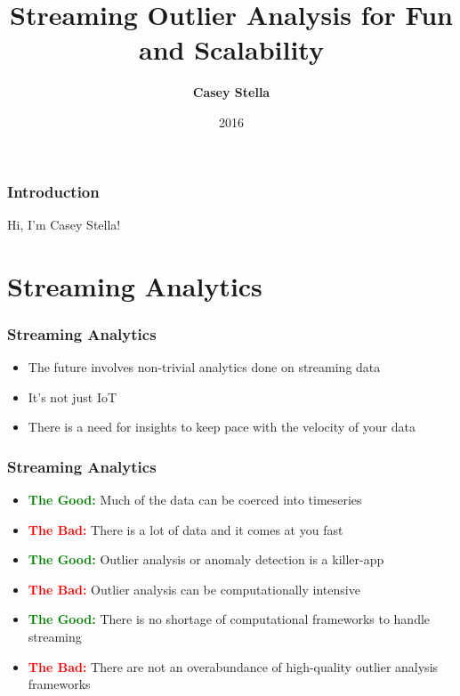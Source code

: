 \documentclass[aspectratio=169]{beamer}
\begin{document}
\author{{\bf Casey Stella}}
\title{{\bf Streaming Outlier Analysis for Fun and Scalability}}
\date{2016} 

\frame{\titlepage} 

\begingroup
\Huge
\begin{frame}
\frametitle{Introduction}
\begin{center}
Hi, I'm Casey Stella!
\end{center}
\end{frame}
\endgroup

\section{Streaming Analytics}
\begin{frame}
\frametitle{Streaming Analytics}
\begin{itemize}
\item The future involves non-trivial analytics done on streaming data
\item It's not just IoT
\item There is a need for insights to keep pace with the velocity of your data
\end{itemize}
\end{frame}

\begin{frame}
\frametitle{Streaming Analytics}
\begin{itemize}
\item {\textcolor{green}{\bf The Good:}} Much of the data can be coerced into timeseries\pause
\item {\textcolor{red}{\bf The Bad:}} There is a lot of data and it comes at you fast\pause
\item {\textcolor{green}{\bf The Good:}} Outlier analysis or anomaly detection is a killer-app\pause
\item {\textcolor{red}{\bf The Bad:}} Outlier analysis can be computationally intensive\pause
\item {\textcolor{green}{\bf The Good:}} There is no shortage of computational frameworks to handle streaming\pause
\item {\textcolor{red}{\bf The Bad:}} There are not an overabundance of high-quality outlier analysis frameworks
\end{itemize}
\end{frame}
\end{document}
